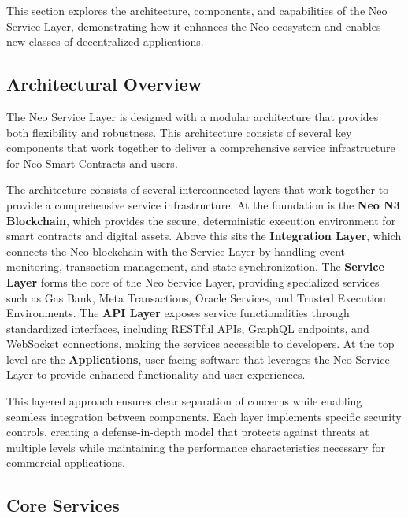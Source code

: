 \documentclass[12pt,a4paper]{article}
\begin{document}
This section explores the architecture, components, and capabilities of the Neo Service Layer, demonstrating how it enhances the Neo ecosystem and enables new classes of decentralized applications.

\subsection{Architectural Overview}
\label{subsec:nsl-architecture}

The Neo Service Layer is designed with a modular architecture that provides both flexibility and robustness. This architecture consists of several key components that work together to deliver a comprehensive service infrastructure for Neo Smart Contracts and users.



The architecture consists of several interconnected layers that work together to provide a comprehensive service infrastructure. At the foundation is the \textbf{Neo N3 Blockchain}, which provides the secure, deterministic execution environment for smart contracts and digital assets. Above this sits the \textbf{Integration Layer}, which connects the Neo blockchain with the Service Layer by handling event monitoring, transaction management, and state synchronization. The \textbf{Service Layer} forms the core of the Neo Service Layer, providing specialized services such as Gas Bank, Meta Transactions, Oracle Services, and Trusted Execution Environments. The \textbf{API Layer} exposes service functionalities through standardized interfaces, including RESTful APIs, GraphQL endpoints, and WebSocket connections, making the services accessible to developers. At the top level are the \textbf{Applications}, user-facing software that leverages the Neo Service Layer to provide enhanced functionality and user experiences.

This layered approach ensures clear separation of concerns while enabling seamless integration between components. Each layer implements specific security controls, creating a defense-in-depth model that protects against threats at multiple levels while maintaining the performance characteristics necessary for commercial applications.

\subsection{Core Services}
\label{subsec:nsl-core-services}
\end{document}
